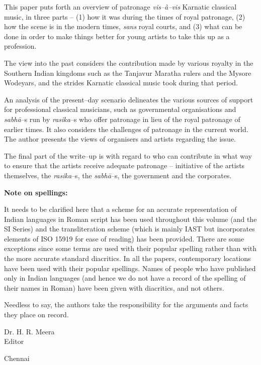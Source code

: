 This paper puts forth an overview of patronage \textit{vis–à–vis} Karnatic classical music, in three parts – (1) how it was during the times of royal patronage, (2) how the scene is in the modern times, \textit{sans} royal courts, and (3) what can be done in order to make things better for young artists to take this up as a profession.

The view into the past considers the contribution made by various royalty in the Southern Indian kingdoms such as the Tanjavur Maratha rulers and the Mysore Wodeyars, and the strides Karnatic classical music took during that period.

An analysis of the present–day scenario delineates the various sources of support for professional classical musicians, such as governmental organisations and \textit{sabhā}–s run by \textit{rasika}–s who offer patronage in lieu of the royal patronage of earlier times. It also considers the challenges of patronage in the current world. The author presents the views of organisers and artists regarding the issue.

The final part of the write–up is with regard to who can contribute in what way to ensure that the artists receive adequate patronage – initiative of the artists themselves, the \textit{rasika}–s, the \textit{sabhā}–s, the government and the corporates.

\delimiter

\textbf{Note on spellings: }

It needs to be clarified here that a scheme for an accurate representation of Indian languages in Roman script has been used throughout this volume (and the SI Series) and the transliteration scheme (which is mainly IAST but incorporates elements of ISO 15919 for ease of reading) has been provided. There are some exceptions since some terms are used with their popular spelling rather than with the more accurate standard diacritics. In all the papers, contemporary locations have been used with their popular spellings. Names of people who have published only in Indian languages (and hence we do not have a record of the spelling of their names in Roman) have been given with diacritics, and not others.

Needless to say, the authors take the responsibility for the arguments and facts they place on record.

\begin{flushright}
Dr. H. R. Meera\\ Editor
\end{flushright}

Chennai

